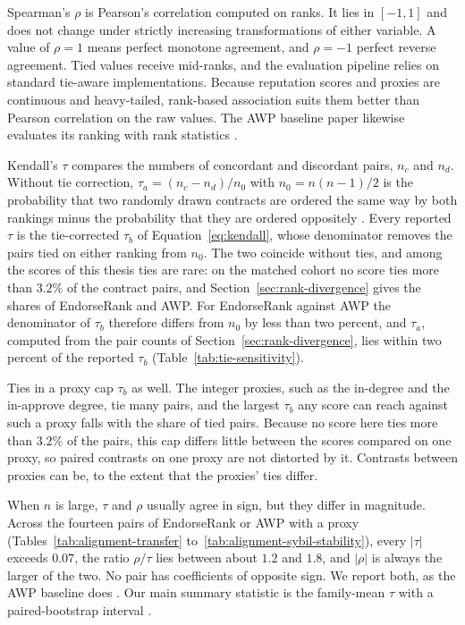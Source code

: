 
Spearman's $\rho$ is Pearson's correlation computed on ranks. It lies in $[-1,1]$ and does not change under strictly increasing transformations of either variable. A value of $\rho=1$ means perfect monotone agreement, and $\rho=-1$ perfect reverse agreement. Tied values receive mid-ranks, and the evaluation pipeline relies on standard tie-aware implementations. Because reputation scores and proxies are continuous and heavy-tailed, rank-based association suits them better than Pearson correlation on the raw values. The AWP baseline paper likewise evaluates its ranking with rank statistics \parencite{do2023awp}.


Kendall's $\tau$ compares the numbers of concordant and discordant pairs, $n_c$ and $n_d$. Without tie correction, $\tau_a=(n_c-n_d)/n_0$ with $n_0=n(n-1)/2$ is the probability that two randomly drawn contracts are ordered the same way by both rankings minus the probability that they are ordered oppositely \parencite{kendall1938rank}. Every reported $\tau$ is the tie-corrected $\tau_b$ of Equation~\eqref{eq:kendall}, whose denominator removes the pairs tied on either ranking from $n_0$. The two coincide without ties, and among the scores of this thesis ties are rare: on the matched cohort no score ties more than $3.2\%$ of the contract pairs, and Section~\ref{sec:rank-divergence} gives the shares of EndorseRank and AWP. For EndorseRank against AWP the denominator of $\tau_b$ therefore differs from $n_0$ by less than two percent, and $\tau_a$, computed from the pair counts of Section~\ref{sec:rank-divergence}, lies within two percent of the reported $\tau_b$ (Table~\ref{tab:tie-sensitivity}).

Ties in a proxy cap $\tau_b$ as well. The integer proxies, such as the in-degree and the in-approve degree, tie many pairs, and the largest $\tau_b$ any score can reach against such a proxy falls with the share of tied pairs. Because no score here ties more than $3.2\%$ of the pairs, this cap differs little between the scores compared on one proxy, so paired contrasts on one proxy are not distorted by it. Contrasts between proxies can be, to the extent that the proxies' ties differ.

When $n$ is large, $\tau$ and $\rho$ usually agree in sign, but they differ in magnitude. Across the fourteen pairs of EndorseRank or AWP with a proxy (Tables~\ref{tab:alignment-transfer} to~\ref{tab:alignment-sybil-stability}), every $|\tau|$ exceeds $0.07$, the ratio $\rho/\tau$ lies between about $1.2$ and $1.8$, and $|\rho|$ is always the larger of the two. No pair has coefficients of opposite sign. We report both, as the AWP baseline does \parencite{do2023awp}. Our main summary statistic is the family-mean $\tau$ with a paired-bootstrap interval \parencite{efron1979bootstrap}.

